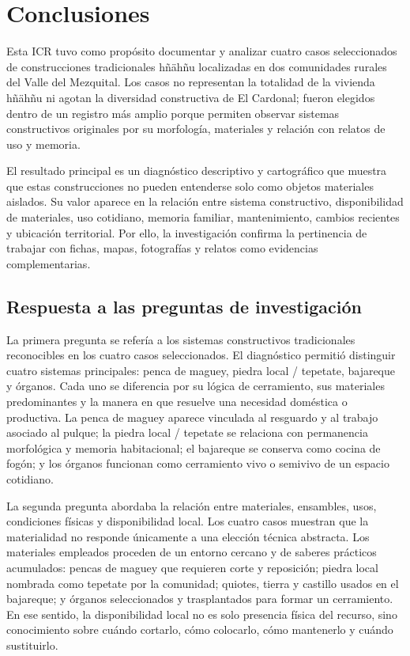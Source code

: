 \section{Conclusiones}

Esta ICR tuvo como propósito documentar y analizar cuatro casos seleccionados de construcciones tradicionales hñähñu localizadas en dos comunidades rurales del Valle del Mezquital. Los casos no representan la totalidad de la vivienda hñähñu ni agotan la diversidad constructiva de El Cardonal; fueron elegidos dentro de un registro más amplio porque permiten observar sistemas constructivos originales por su morfología, materiales y relación con relatos de uso y memoria.

El resultado principal es un diagnóstico descriptivo y cartográfico que muestra que estas construcciones no pueden entenderse solo como objetos materiales aislados. Su valor aparece en la relación entre sistema constructivo, disponibilidad de materiales, uso cotidiano, memoria familiar, mantenimiento, cambios recientes y ubicación territorial. Por ello, la investigación confirma la pertinencia de trabajar con fichas, mapas, fotografías y relatos como evidencias complementarias.

\subsection{Respuesta a las preguntas de investigación}

La primera pregunta se refería a los sistemas constructivos tradicionales reconocibles en los cuatro casos seleccionados. El diagnóstico permitió distinguir cuatro sistemas principales: penca de maguey, piedra local / tepetate, bajareque y órganos. Cada uno se diferencia por su lógica de cerramiento, sus materiales predominantes y la manera en que resuelve una necesidad doméstica o productiva. La penca de maguey aparece vinculada al resguardo y al trabajo asociado al pulque; la piedra local / tepetate se relaciona con permanencia morfológica y memoria habitacional; el bajareque se conserva como cocina de fogón; y los órganos funcionan como cerramiento vivo o semivivo de un espacio cotidiano.

La segunda pregunta abordaba la relación entre materiales, ensambles, usos, condiciones físicas y disponibilidad local. Los cuatro casos muestran que la materialidad no responde únicamente a una elección técnica abstracta. Los materiales empleados proceden de un entorno cercano y de saberes prácticos acumulados: pencas de maguey que requieren corte y reposición; piedra local nombrada como tepetate por la comunidad; quiotes, tierra y castillo usados en el bajareque; y órganos seleccionados y trasplantados para formar un cerramiento. En ese sentido, la disponibilidad local no es solo presencia física del recurso, sino conocimiento sobre cuándo cortarlo, cómo colocarlo, cómo mantenerlo y cuándo sustituirlo.

